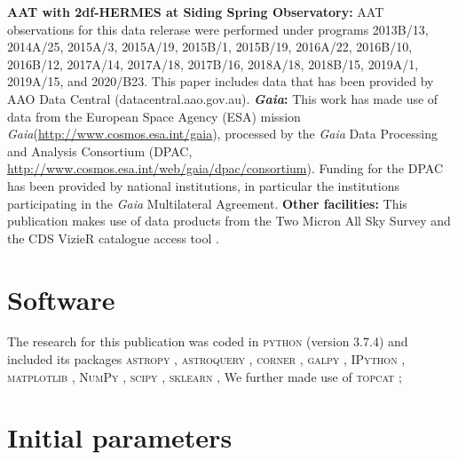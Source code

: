 \documentclass[
  journal=pasa,
  manuscript=research-paper, %
  year=2023,
  volume=37
]{cup-journal}
\newcommand{\Gaia}{\textit{Gaia}\xspace}
\begin{document}
\textbf{AAT with 2df-HERMES at Siding Spring Observatory:}
AAT observations for this data relerase were performed under programs {2013B/13}, {2014A/25}, {2015A/3}, {2015A/19}, {2015B/1}, {2015B/19}, {2016A/22}, {2016B/10}, {2016B/12}, {2017A/14}, {2017A/18}, {2017B/16}, {2018A/18}, {2018B/15}, {2019A/1}, {2019A/15}, and {2020/B23}. This paper includes data that has been provided by AAO Data Central (datacentral.aao.gov.au).
\textbf{\Gaia: } This work has made use of data from the European Space Agency (ESA) mission \Gaia (\url{http://www.cosmos.esa.int/gaia}), processed by the \Gaia Data Processing and Analysis Consortium (DPAC, \url{http://www.cosmos.esa.int/web/gaia/dpac/consortium}). Funding for the DPAC has been provided by national institutions, in particular the institutions participating in the \Gaia Multilateral Agreement. 
\textbf{Other facilities:} This publication makes use of data products from the Two Micron All Sky Survey \citep{Skrutskie2006} and the CDS VizieR catalogue access tool \citep{Vizier2000}.

\section*{Software}

The research for this publication was coded in \textsc{python} (version 3.7.4) and included its packages
\textsc{astropy} \citep[v. 3.2.2;][]{Robitaille2013,PriceWhelan2018},
\textsc{astroquery} \citep[v. 0.4;][]{Ginsburg2019},
\textsc{corner} \citep[v. 2.0.1;][]{corner},
\textsc{galpy} \citep[version 1.6.0;][]{Bovy2015},
\textsc{IPython} \citep[v. 7.8.0;][]{ipython},
\textsc{matplotlib} \citep[v. 3.1.3;][]{matplotlib},
\textsc{NumPy} \citep[v. 1.17.2;][]{numpy},
\textsc{scipy} \citep[version 1.3.1;][]{scipy},
\textsc{sklearn} \citep[v. 0.21.3;][]{scikit-learn},
We further made use of \textsc{topcat} \citep[version 4.7;][]{Taylor2005};




\appendix

\section{Initial parameters}
\end{document}
